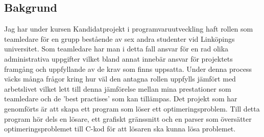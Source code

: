 \subsection{Bakgrund}
Jag har under kursen Kandidatprojekt i programvaruutveckling haft rollen som teamledare för en grupp bestående av sex andra studenter vid Linköpings universitet. Som teamledare har man i detta fall ansvar för en rad olika administrativa uppgifter vilket bland annat innebär ansvar för projektets framgång och uppfyllande av de krav som finns uppsatta. Under denna process väcks många frågor kring hur väl den antagna rollen uppfylls jämfört med arbetslivet vilket lett till denna jämförelse mellan mina prestationer som teamledare och de 'best practises' som kan tillämpas.
\newline \newline
Det projekt som har genomförts är att skapa ett program som löser ett optimeringsproblem. Till detta program hör dels en lösare, ett grafiskt gränssnitt och en parser som översätter optimeringsproblemet till C-kod för att lösaren ska kunna lösa problemet. 